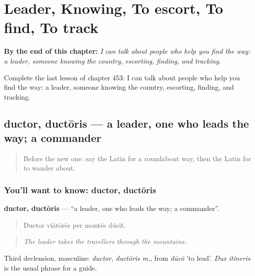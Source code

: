
\chapter{Leader, Knowing, To escort, To find, To track}
\label{ch:la-leader-knowing-to-escort-to-find-to-track}

\begin{chapteropening}
\textbf{By the end of this chapter:} \emph{I can talk about people who help you find the way: a leader, someone knowing the country, escorting, finding, and tracking.}

Complete the last lesson of chapter 453: I can talk about people who help you find the way: a leader, someone knowing the country, escorting, finding, and tracking.
\end{chapteropening}

\section[ductor, ductōris]{ductor, ductōris — a leader, one who leads the way; a commander}

\label{lesson:LA-C453-ductor}



\begin{quote}
Before the new one: say the Latin for a roundabout way, then the Latin for to wander about.
\end{quote}

\subsection*{You'll want to know: ductor, ductōris}
\textbf{ductor, ductōris} — \textquotedblleft{}a leader, one who leads the way; a commander\textquotedblright{}.

\begin{quote}
Ductor viātōrēs per montēs dūcit.
\end{quote}

\begin{quote}
\emph{The leader takes the travellers through the mountains.}
\end{quote}

Third declension, masculine: \emph{ductor, ductōris m.}, from \emph{dūcō} 'to lead'. \emph{Dux itineris} is the usual phrase for a guide.

